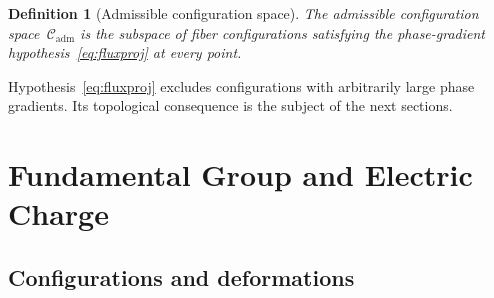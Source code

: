 \documentclass[11pt,a4paper]{article}
\newtheorem{definition}[theorem]{Definition}
\newcommand{\Cadm}{\mathcal{C}_{\mathrm{adm}}}
\begin{document}
      \begin{definition}[Admissible configuration space]
        \label{def:Cadm}
        The admissible configuration space~$\Cadm$ is the subspace of
        fiber configurations satisfying the phase-gradient
        hypothesis~\eqref{eq:fluxproj} at every point.
      \end{definition}

      Hypothesis~\eqref{eq:fluxproj} excludes configurations with
      arbitrarily large phase gradients.
      Its topological consequence is the subject of the next sections.

  \section{Fundamental Group and Electric Charge}
    \label{sec:charge}

    \subsection{Configurations and deformations}
      \label{subsec:configurations}
\end{document}
